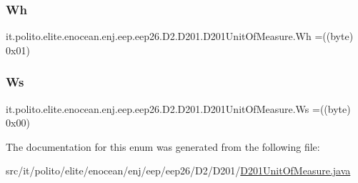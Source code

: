 \hypertarget{enumit_1_1polito_1_1elite_1_1enocean_1_1enj_1_1eep_1_1eep26_1_1_d2_1_1_d201_1_1_d201_unit_of_measure_a1de3c9981b9efc16a99dd4d6022e6e30}{}\label{enumit_1_1polito_1_1elite_1_1enocean_1_1enj_1_1eep_1_1eep26_1_1_d2_1_1_d201_1_1_d201_unit_of_measure_a1de3c9981b9efc16a99dd4d6022e6e30} 
\subsubsection{\texorpdfstring{Wh}{Wh}}
{\footnotesize\ttfamily it.\+polito.\+elite.\+enocean.\+enj.\+eep.\+eep26.\+D2.\+D201.\+D201\+Unit\+Of\+Measure.\+Wh =((byte) 0x01)}

\hypertarget{enumit_1_1polito_1_1elite_1_1enocean_1_1enj_1_1eep_1_1eep26_1_1_d2_1_1_d201_1_1_d201_unit_of_measure_aa2b2299b3662e3aba3138ab55d2b90d4}{}\label{enumit_1_1polito_1_1elite_1_1enocean_1_1enj_1_1eep_1_1eep26_1_1_d2_1_1_d201_1_1_d201_unit_of_measure_aa2b2299b3662e3aba3138ab55d2b90d4} 
\subsubsection{\texorpdfstring{Ws}{Ws}}
{\footnotesize\ttfamily it.\+polito.\+elite.\+enocean.\+enj.\+eep.\+eep26.\+D2.\+D201.\+D201\+Unit\+Of\+Measure.\+Ws =((byte) 0x00)}



The documentation for this enum was generated from the following file\+:\begin{DoxyCompactItemize}
\item 
src/it/polito/elite/enocean/enj/eep/eep26/\+D2/\+D201/\hyperlink{_d201_unit_of_measure_8java}{D201\+Unit\+Of\+Measure.\+java}\end{DoxyCompactItemize}
